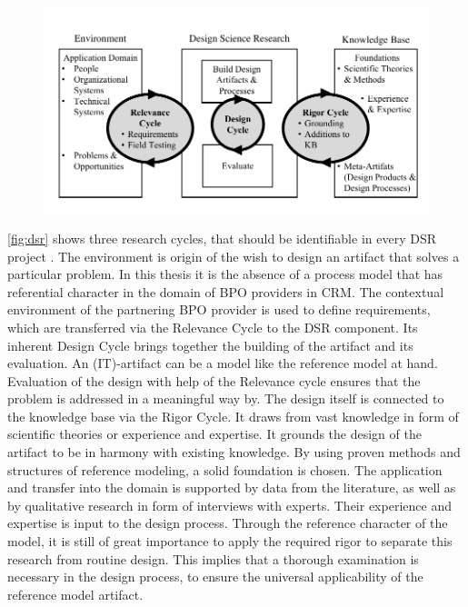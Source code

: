 			
\begin{figure}[caption={Design science research cycles Source: \cite{Hevner2010}}, label={fig:dsr}]
	{	\includegraphics[width=.8\textwidth]{figures/dsr.pdf}}
\end{figure}


\ref{fig:dsr} shows three research cycles, that should be identifiable in every \acrshort{DSR} project \cite{Hevner2010}. The environment is origin of the wish to design an artifact that solves a particular problem. In this thesis it is the absence of a process model that has referential character in the domain of \acrshort{BPO} providers in \acrshort{CRM}. The contextual environment of the partnering  \acrshort{BPO} provider is used to define requirements, which are transferred via the Relevance Cycle to the \acrshort{DSR} component. Its inherent Design Cycle brings together the building of the artifact and its evaluation. An (IT)-artifact can be a model \cite{Hevner2010} like the reference model at hand. Evaluation of the design with help of the Relevance cycle ensures that the problem is addressed in a meaningful way by. The design itself is connected to the knowledge base via the Rigor Cycle. It draws from vast knowledge in form of scientific theories or experience and expertise. It grounds the design of the artifact to be in harmony with existing knowledge. By using proven methods and structures of reference modeling, a solid foundation is chosen. The application and transfer into the domain is supported by data from the literature, as well as by qualitative research in form of interviews with experts. Their experience and expertise is input to the design process. Through the reference character of the model, it is still of great importance to apply the required rigor to separate this research from routine design. This implies that a thorough examination is necessary in the design process, to ensure the universal applicability of the reference model artifact. 



